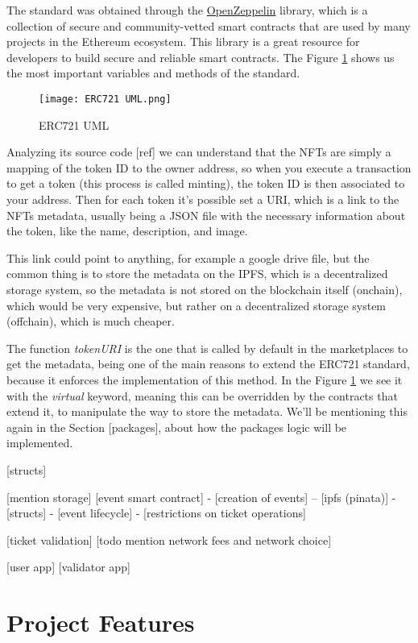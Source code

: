 The standard was obtained through the \href{https://docs.openzeppelin.com/contracts/api/token/erc721#ERC721}{OpenZeppelin} library, which is a collection of secure and community-vetted smart contracts that are used by many projects in the Ethereum ecosystem. This library is a great resource for developers to build secure and reliable smart contracts. The Figure \ref{fig:erc721_uml} shows us the most important variables and methods of the standard.

\begin{figure}[H]
    \texttt{[image: ERC721 UML.png]}
    \centering
    \caption{ERC721 UML}
    \label{fig:erc721_uml}
\end{figure}

Analyzing its source code [ref] we can understand that the NFTs are simply a mapping of the token ID to the owner address, so when you execute a transaction to get a token (this process is called minting), the token ID is then associated to your address. Then for each token it's possible set a URI, which is a link to the NFTs metadata, usually being a JSON file with the necessary information about the token, like the name, description, and image.

This link could point to anything, for example a google drive file, but the common thing is to store the metadata on the IPFS, which is a decentralized storage system, so the metadata is not stored on the blockchain itself (onchain), which would be very expensive, but rather on a decentralized storage system (offchain), which is much cheaper.

The function \textit{tokenURI} is the one that is called by default in the marketplaces to get the metadata, being one of the main reasons to extend the ERC721 standard, because it enforces the implementation of this method. In the Figure \ref{fig:erc721_uml} we see it with the \textit{virtual} keyword, meaning this can be overridden by the contracts that extend it, to manipulate the way to store the metadata. We'll be mentioning this again in the Section [packages], about how the packages logic will be implemented.

    [structs]

    [mention storage]
    [event smart contract]
- [creation of events]
-- [ipfs (pinata)]
- [structs]
- [event lifecycle]
- [restrictions on ticket operations]

[ticket validation]
[todo mention network fees and network choice]

[user app]
[validator app]

\section{Project Features}
